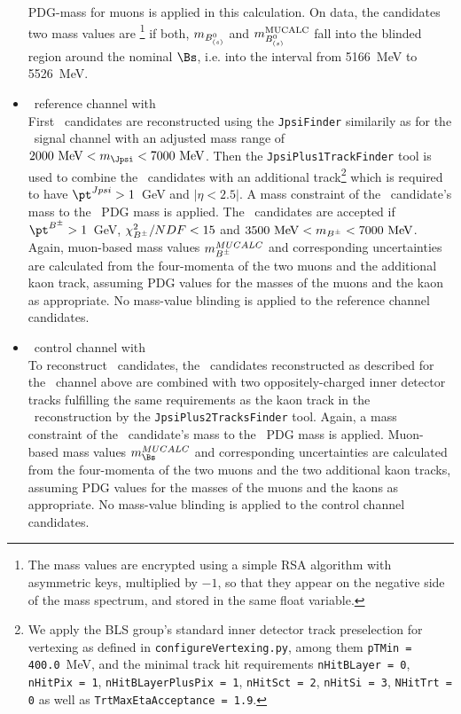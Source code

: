 \begin{itemize}
  PDG-mass for muons is applied in this calculation.
  On data, the candidates two mass values are 
  \footnote{
    The mass values are encrypted using a simple RSA algorithm with 
    asymmetric keys, multiplied by $-1$, so that they 
    appear on the negative side of the mass spectrum, 
    and stored in the same float variable.
  }
  if both, $m_{B_{(s)}^0}$ and $m^{\mathrm{MUCALC}}_{B_{(s)}^0}$ fall into the blinded
  region around the nominal $\Bs$, i.e. into the interval from
  5166~MeV to 5526~MeV.
\item \BpmKpmJpsi\ reference channel with \JpsiMuMu\\
  First \Jpsi\ candidates are reconstructed using the
  \texttt{JpsiFinder} similarily as for the \Bmumu\ signal channel
  with an adjusted mass range of
  $2000~\mathrm{MeV} < m_{\Jpsi} < 7000~\mathrm{MeV}$.
  Then the \texttt{JpsiPlus1TrackFinder} tool is used to combine the \Jpsi\ 
  candidates with an additional track\footnote{
    We apply the BLS group's standard inner detector track preselection
    for vertexing as defined in \texttt{configureVertexing.py}, among
    them 
    \texttt{pTMin = 400.0}~MeV,
    and the minimal track hit requirements
    \texttt{nHitBLayer = 0}, 
    \texttt{nHitPix = 1},
    \texttt{nHitBLayerPlusPix = 1},
    \texttt{nHitSct = 2},
    \texttt{nHitSi = 3},
    \texttt{NHitTrt = 0} 
    as well as
    \texttt{TrtMaxEtaAcceptance = 1.9}.
  }
  which is required to have  
  $\pt^{Jpsi} > 1$~GeV and $|\eta < 2.5|$.  A mass constraint of the \Jpsi\
  candidate's mass to the \Jpsi\ PDG mass is applied. 
  The \Bpm\ candidates are 
  accepted if $\pt^{\Bpm} > 1$~GeV, $\chi^2_{B^\pm}/NDF < 15$ and
  $3500~\mathrm{MeV} < m_{B^\pm} < 7000~\mathrm{MeV}$.
  Again, muon-based mass values $m^{MUCALC}_{B^\pm}$ and corresponding 
  uncertainties are calculated
  from the four-momenta of the two muons and the additional kaon
  track, assuming PDG values for the masses of the muons and the kaon
  as appropriate.  No mass-value blinding is applied to the reference
  channel candidates.
\item \BsJpsiPhi\ control channel with \JpsiMuMu\\
  To reconstruct \BsJpsiPhi\ candidates, the \Jpsi\ candidates
  reconstructed as described for the  \BpmKpmJpsi\ channel above are
  combined with two oppositely-charged inner detector tracks
  fulfilling the same requirements as the kaon track in the
  \BpmKpmJpsi\ reconstruction by the \texttt{JpsiPlus2TracksFinder}
  tool. Again, a mass constraint of the \Jpsi\ candidate's mass to the
  \Jpsi\ PDG mass is applied.
  Muon-based mass values $m^{MUCALC}_{\Bs}$ and corresponding 
  uncertainties are calculated
  from the four-momenta of the two muons and the two additional kaon
  tracks, assuming PDG values for the masses of the muons and the kaons
  as appropriate.  No mass-value blinding is applied to the control
  channel candidates.
\end{itemize}

